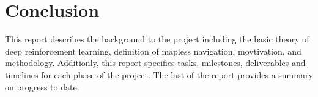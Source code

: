 \section{Conclusion}

This report describes the background to the project including the basic theory of deep reinforcement learning, definition of mapless navigation, movtivation, and methodology. Additionly, this report specifies tasks, milestones, deliverables and timelines for each phase of the project. The last of the report provides a summary on progress to date.
